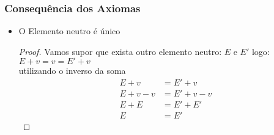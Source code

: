 \documentclass{article}
\theoremstyle{plain}
\theoremstyle{remark}
\numberwithin{equation}{section}
\numberwithin{thm}{section}
\numberwithin{defn}{section}
\numberwithin{lemma}{section}
\numberwithin{axm}{section}
\begin{document}
\subsubsection*{Consequência dos Axiomas}
\begin{itemize}
	\item O Elemento neutro é único  \begin{proof}
	  		Vamos supor que exista outro  elemento neutro: \(E \text{ e } E'\) logo: \( E + v = v = E' + v\)\\
	  		utilizando o inverso da soma
	  		\begin{align*}
	  		E + v &= E' + v \\
	  		E + v - v &= E' + v - v \\
	  		E + E &= E ' + E' \\
	  		E &= E'
	  		\end{align*}
					  		
	  		
	  \end{proof}


\end{itemize}
\end{document}
